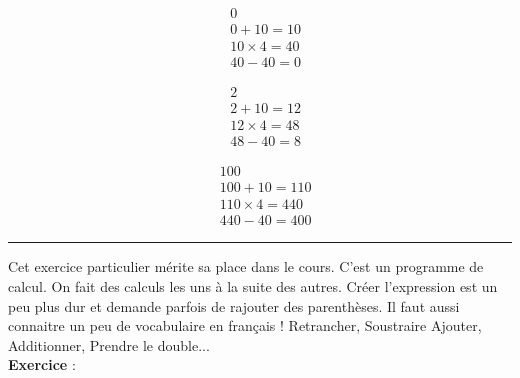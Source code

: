 \documentclass[11pt]{article}
\newcommand{\horrule}[1]{\rule{\linewidth}{#1}} %
\begin{document}
\begin{minipage}{0.3\textwidth}

\begin{align*}
& 0 \\
& 0 + 10 = 10 \\
& 10 \times 4 = 40\\
& 40 - 40 = 0
\end{align*}

\end{minipage}\begin{minipage}{0.3\textwidth}

\begin{align*}
& 2 \\
& 2 + 10 = 12 \\
& 12 \times 4 = 48\\
& 48 - 40 = 8
\end{align*}

\end{minipage}\begin{minipage}{0.3\textwidth}

\begin{align*}
& 100 \\
& 100 + 10 = 110 \\
& 110 \times 4 = 440\\
& 440 - 40 = 400
\end{align*}

\end{minipage}

\vspace{1.5cm}\horrule{1px}\vspace{1.5cm}

Cet exercice particulier mérite sa place dans le cours. C'est un programme de calcul. On fait des calculs les uns à la suite des autres. Créer l'expression est un peu plus dur et demande parfois de rajouter des parenthèses. Il faut aussi connaitre un peu de vocabulaire en français ! Retrancher, Soustraire Ajouter, Additionner, Prendre le double... \\

\textbf{Exercice} : 

\begin{center}\end{center}
\end{document}
